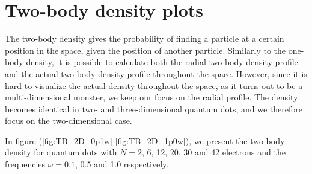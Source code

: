\newpage
\section{Two-body density plots} \label{sec:twobody}
The two-body density gives the probability of finding a particle at a certain position in the space, given the position of another particle. Similarly to the one-body density, it is possible to calculate both the radial two-body density profile and the actual two-body density profile throughout the space. However, since it is hard to visualize the actual density throughout the space, as it turns out to be a multi-dimensional monster, we keep our focus on the radial profile. The density becomes identical in two- and three-dimensional quantum dots, and we therefore focus on the two-dimensional case. 

In figure (\ref{fig:TB_2D_0p1w}-\ref{fig:TB_2D_1p0w}), we present the two-body density for quantum dots with $N=2$, 6, 12, 20, 30 and 42 electrons and the frequencies $\omega=0.1$, 0.5 and 1.0 respectively. 

